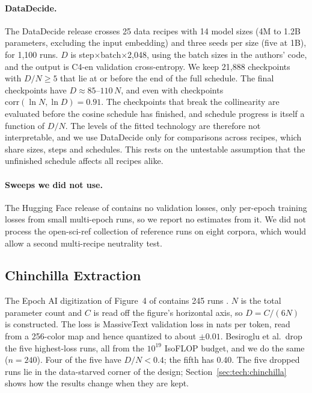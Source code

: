 \paragraph{DataDecide.}
The DataDecide release \citep{magnusson2025datadecide} crosses 25 data recipes with 14 model sizes (4M to 1.2B
parameters, excluding the input embedding) and three seeds per size (five at 1B), for 1,100 runs. $D$ is
step$\times$batch$\times$2,048, using the batch sizes in the authors' code, and the output is C4-en validation
cross-entropy. We keep 21,888 checkpoints with $D/N\ge5$ that lie at or before the end of the full schedule. The final
checkpoints have $D\approx85$--$110\,N$, and even with checkpoints $\mathrm{corr}(\ln N,\ln D)=0.91$. The checkpoints
that break the collinearity are evaluated before the cosine schedule has finished, and schedule progress is itself a
function of $D/N$. The levels of the fitted technology are therefore not interpretable, and we use DataDecide only for
comparisons across recipes, which share sizes, steps and schedules. This rests on the untestable assumption that the
unfinished schedule affects all recipes alike.

\paragraph{Sweeps we did not use.}
The Hugging Face release of \citet{kricheli2026tokens} contains no validation losses, only per-epoch training losses
from small multi-epoch runs, so we report no estimates from it. We did not process the open-sci-ref collection of
reference runs on eight corpora, which would allow a second multi-recipe neutrality test.

\subsection{Chinchilla Extraction}\label{app:chinchilla}

The Epoch AI digitization of Figure~4 of \citet{hoffmann2022training} contains 245 runs \citep{besiroglu2024chinchilla}.
$N$ is the total parameter count and $C$ is read off the figure's horizontal axis, so $D=C/(6N)$ is constructed. The
loss is MassiveText validation loss in nats per token, read from a 256-color map and hence quantized to about
$\pm0.01$. Besiroglu et al.\ drop the five highest-loss runs, all from the $10^{19}$ IsoFLOP budget, and we do the same
($n=240$). Four of the five have $D/N<0.4$; the fifth has 0.40. The five dropped runs lie in the data-starved corner
of the design; Section~\ref{sec:tech:chinchilla} shows how the results change when they are kept.

